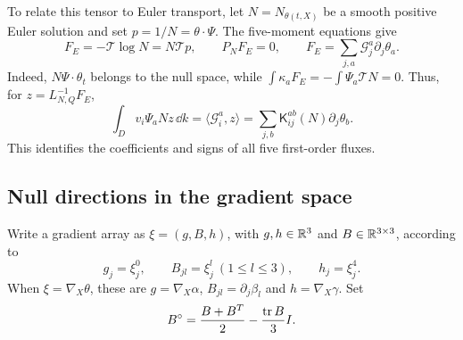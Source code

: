 To relate this tensor to Euler transport, let $N=N_{\theta(t,X)}$
be a smooth positive Euler solution and set $p=1/N=\theta\cdot\Psi$.
The five-moment equations give
\begin{equation}\label{ons:euler-force}
 F_E=-\mathcal T\log N=N\mathcal Tp,
 \qquad P_NF_E=0,
 \qquad F_E=\sum_{j,a}\mathcal G_j^a\partial_j\theta_a.
\end{equation}
Indeed, $N\Psi\cdot\theta_t$ belongs to the null space, while
$\int\kappa_aF_E=-\int\Psi_a\mathcal TN=0$.
Thus, for $z=L_{N,Q}^{-1}F_E$,
\begin{equation}\label{ons:cell-flux}
 \int_Dv_i\Psi_aNz\,\dd k
 =\langle\mathcal G_i^a,z\rangle
 =\sum_{j,b}\mathsf K_{ij}^{ab}(N)\partial_j\theta_b.
\end{equation}
This identifies the coefficients and signs of all five first-order fluxes.

\subsection{Null directions in the gradient space}

Write a gradient array as $\xi=(g,B,h)$, with
$g,h\in\mathbb R^3$ and $B\in\mathbb R^{3\times3}$, according to
\[
 g_j=\xi_j^0,\qquad B_{jl}=\xi_j^l\ (1\le l\le3),
 \qquad h_j=\xi_j^4.
\]
When $\xi=\nabla_X\theta$, these are $g=\nabla_X\alpha$,
$B_{jl}=\partial_j\beta_l$ and $h=\nabla_X\gamma$.
Set
\[
 B^\circ=\frac{B+B^T}{2}-\frac{\operatorname{tr} B}{3}I.
\]


